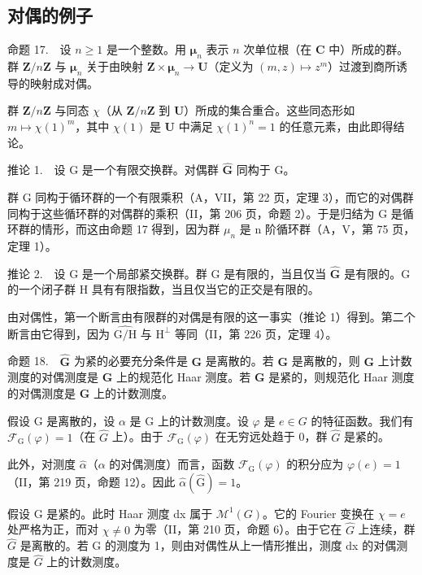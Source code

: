 \subsection{对偶的例子}

命题 17.　设 \(n \geqslant 1\) 是一个整数。用 \(\boldsymbol{\mu}_{n}\) 表示 \(n\) 次单位根（在 \(\mathbf{C}\) 中）所成的群。群 \(\mathbf{Z}/n\mathbf{Z}\) 与 \(\boldsymbol{\mu}_{n}\) 关于由映射 \(\mathbf{Z} \times \boldsymbol{\mu}_{n} \to \mathbf{U}\)（定义为 \((m,z) \mapsto z^{m}\)）过渡到商所诱导的映射成对偶。

群 \(\mathbf{Z}/n\mathbf{Z}\) 与同态 \(\chi\)（从 \(\mathbf{Z}/n\mathbf{Z}\) 到 \(\mathbf{U}\)）所成的集合重合。这些同态形如 \(m \mapsto \chi(1)^m\)，其中 \(\chi(1)\) 是 \(\mathbf{U}\) 中满足 \(\chi(1)^n = 1\) 的任意元素，由此即得结论。

推论 1.　设 G 是一个有限交换群。对偶群 \(\widehat{\mathbf{G}}\) 同构于 G。

群 G 同构于循环群的一个有限乘积（A，VII，第 22 页，定理 3），而它的对偶群同构于这些循环群的对偶群的乘积（II，第 206 页，命题 2）。于是归结为 G 是循环群的情形，而这由命题 17 得到，因为群 \(\mu_{n}\) 是 n 阶循环群（A，V，第 75 页，定理 1）。

推论 2.　设 G 是一个局部紧交换群。群 G 是有限的，当且仅当 \(\widehat{\mathbf{G}}\) 是有限的。G 的一个闭子群 H 具有有限指数，当且仅当它的正交是有限的。

由对偶性，第一个断言由有限群的对偶是有限的这一事实（推论 1）得到。第二个断言由它得到，因为 \(\widehat{\mathrm{G / H}}\) 与 \(\mathrm{H}^{\perp}\) 等同（II，第 226 页，定理 4）。

命题 18.　\(\widehat{\mathbf{G}}\) 为紧的必要充分条件是 \(\mathbf{G}\) 是离散的。若 \(\mathbf{G}\) 是离散的，则 \(\mathbf{G}\) 上计数测度的对偶测度是 \(\widehat{\mathbf{G}}\) 上的规范化 Haar 测度。若 \(\mathbf{G}\) 是紧的，则规范化 Haar 测度的对偶测度是 \(\widehat{\mathbf{G}}\) 上的计数测度。

假设 G 是离散的，设 \(\alpha\) 是 G 上的计数测度。设 \(\varphi\) 是 \(e \in G\) 的特征函数。我们有 \(\mathcal{F}_{\mathrm{G}}(\varphi) = 1\)（在 \(\widehat{G}\) 上）。由于 \(\mathcal{F}_{\mathrm{G}}(\varphi)\) 在无穷远处趋于 0，群 \(\widehat{G}\) 是紧的。

此外，对测度 \(\widehat{\alpha}\)（\(\alpha\) 的对偶测度）而言，函数 \(\mathcal{F}_{\mathrm{G}}(\varphi)\) 的积分应为 \(\varphi(e)=1\)（II，第 219 页，命题 12）。因此 \(\widehat{\alpha}(\widehat{\mathrm{G}})=1\)。

假设 G 是紧的。此时 Haar 测度 dx 属于 \(\mathcal{M}^{1}(G)\)。它的 Fourier 变换在 \(\chi = e\) 处严格为正，而对 \(\chi \neq 0\) 为零（II，第 210 页，命题 6）。由于它在 \(\widehat{G}\) 上连续，群 \(\widehat{G}\) 是离散的。若 G 的测度为 1，则由对偶性从上一情形推出，测度 dx 的对偶测度是 \(\widehat{G}\) 上的计数测度。


